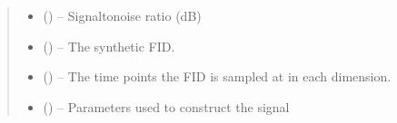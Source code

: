 \documentclass[letterpaper,10pt,english]{sphinxmanual}
\begin{document}
\begin{fulllineitems}
\begin{quote}
\begin{description}
\begin{itemize}
\item {} 
\sphinxAtStartPar
{} (\sphinxstyleliteralemphasis{\sphinxupquote{, }}) – Signal\sphinxhyphen{}to\sphinxhyphen{}noise ratio (dB)

\item {} 
\sphinxAtStartPar
{} () – The synthetic FID.

\item {} 
\sphinxAtStartPar
{} (\sphinxstyleliteralemphasis{\sphinxupquote{{[}}}\sphinxstyleliteralemphasis{\sphinxupquote{{]}}}\sphinxstyleliteralemphasis{\sphinxupquote{, }}\sphinxstyleliteralemphasis{\sphinxupquote{{[}}}\sphinxstyleliteralemphasis{\sphinxupquote{, }}\sphinxstyleliteralemphasis{\sphinxupquote{{]}}}) – The time points the FID is sampled at in each dimension.

\item {} 
\sphinxAtStartPar
{} () – Parameters used to construct the signal

\end{itemize}

\end{description}\end{quote}

\end{fulllineitems}

\end{document}
